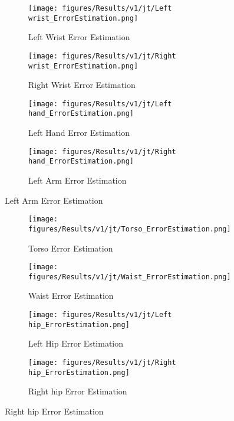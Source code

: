\begin{figure}[!ht]
  \centering
  \begin{subfigure}[b]{0.47\linewidth}
      \centering
      \texttt{[image: figures/Results/v1/jt/Left wrist\_ErrorEstimation.png]}
      \caption{Left Wrist Error Estimation}
      \label{fig:v1_lewr_jt_ee}
  \end{subfigure}
  \hfill
  \begin{subfigure}[b]{0.47\linewidth}
      \centering
      \texttt{[image: figures/Results/v1/jt/Right wrist\_ErrorEstimation.png]}
      \caption{Right Wrist Error Estimation}
      \label{fig:v1_riwr_jt_ee}
  \end{subfigure}
  \hfill
  \begin{subfigure}[b]{0.47\linewidth}
      \centering
      \texttt{[image: figures/Results/v1/jt/Left hand\_ErrorEstimation.png]}
      \caption{Left Hand Error Estimation}
      \label{fig:v1_leha_jt_ee}
  \end{subfigure}
  \hfill
  \begin{subfigure}[b]{0.47\linewidth}
      \centering
      \texttt{[image: figures/Results/v1/jt/Right hand\_ErrorEstimation.png]}
      \caption{Left Arm Error Estimation}
      \label{fig:v1_riha_jt_ee}
  \end{subfigure}
\end{figure}

\begin{figure}[!ht]
  \centering
  \begin{subfigure}[b]{0.47\linewidth}
      \centering
      \texttt{[image: figures/Results/v1/jt/Torso\_ErrorEstimation.png]}
      \caption{Torso Error Estimation}
      \label{fig:v1_torso_jt_ee}
  \end{subfigure}
  \hfill
  \begin{subfigure}[b]{0.47\linewidth}
    \centering
    \texttt{[image: figures/Results/v1/jt/Waist\_ErrorEstimation.png]}
    \caption{Waist Error Estimation}
    \label{fig:v1_waist_jt_ee}
  \end{subfigure}
  \hfill
  \begin{subfigure}[b]{0.47\linewidth}
      \centering
      \texttt{[image: figures/Results/v1/jt/Left hip\_ErrorEstimation.png]}
      \caption{Left Hip Error Estimation}
      \label{fig:v1_lehi_jt_ee}
  \end{subfigure}
  \hfill
  \begin{subfigure}[b]{0.47\linewidth}
      \centering
      \texttt{[image: figures/Results/v1/jt/Right hip\_ErrorEstimation.png]}
      \caption{Right hip Error Estimation}
      \label{fig:v1_rihi_jt_ee}
  \end{subfigure}
\end{figure}


